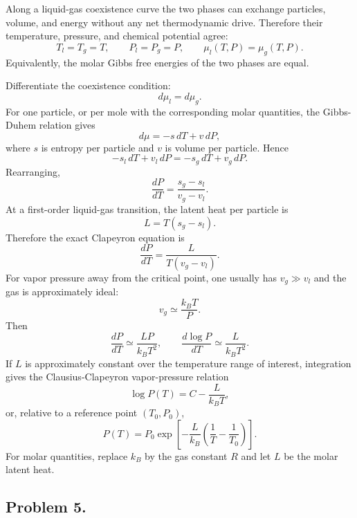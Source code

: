\begin{solution}
Along a liquid-gas coexistence curve the two phases can exchange particles, volume, and energy without any net thermodynamic drive. Therefore their temperature, pressure, and chemical potential agree:
\[
    T_l=T_g=T,\qquad P_l=P_g=P,\qquad \mu_l(T,P)=\mu_g(T,P).
\]
Equivalently, the molar Gibbs free energies of the two phases are equal.

Differentiate the coexistence condition:
\[
    d\mu_l=d\mu_g.
\]
For one particle, or per mole with the corresponding molar quantities, the Gibbs-Duhem relation gives
\[
    d\mu=-s\,dT+v\,dP,
\]
where $s$ is entropy per particle and $v$ is volume per particle. Hence
\[
    -s_l\,dT+v_l\,dP=-s_g\,dT+v_g\,dP.
\]
Rearranging,
\[
    \frac{dP}{dT}
    =\frac{s_g-s_l}{v_g-v_l}.
\]
At a first-order liquid-gas transition, the latent heat per particle is
\[
    L=T(s_g-s_l).
\]
Therefore the exact Clapeyron equation is
\[
    \frac{dP}{dT}
    =\frac{L}{T(v_g-v_l)}.
\]
For vapor pressure away from the critical point, one usually has $v_g\gg v_l$ and the gas is approximately ideal:
\[
    v_g\simeq \frac{k_BT}{P}.
\]
Then
\[
    \frac{dP}{dT}\simeq \frac{LP}{k_BT^2},
    \qquad
    \frac{d\log P}{dT}\simeq \frac{L}{k_BT^2}.
\]
If $L$ is approximately constant over the temperature range of interest, integration gives the Clausius-Clapeyron vapor-pressure relation
\[
    \log P(T)=C-\frac{L}{k_BT},
\]
or, relative to a reference point $(T_0,P_0)$,
\[
    P(T)=P_0
    \exp\left[
        -\frac{L}{k_B}\left(\frac{1}{T}-\frac{1}{T_0}\right)
    \right].
\]
For molar quantities, replace $k_B$ by the gas constant $R$ and let $L$ be the molar latent heat.
\end{solution}

\subsection*{Problem 5.}

